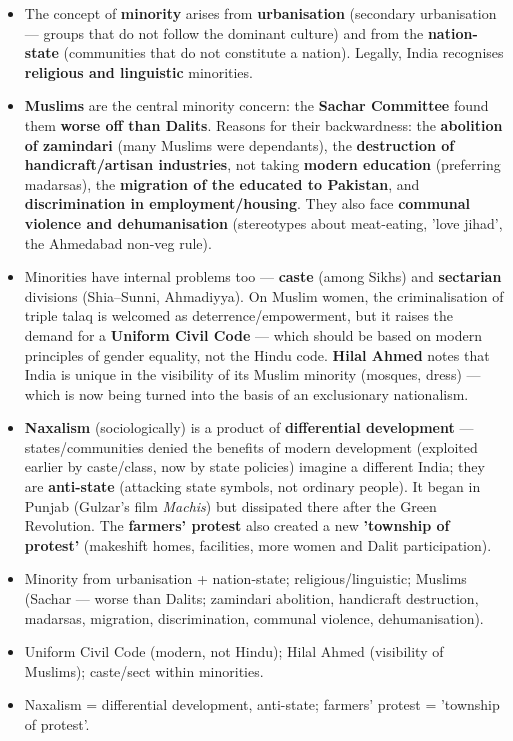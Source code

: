 \begin{KeyConcept}
\begin{itemize}
\item The concept of \textbf{minority} arises from \textbf{urbanisation} (secondary urbanisation --- groups that do not follow the dominant culture) and from the \textbf{nation-state} (communities that do not constitute a nation). Legally, India recognises \textbf{religious and linguistic} minorities.
\item \textbf{Muslims} are the central minority concern: the \textbf{Sachar Committee} found them \textbf{worse off than Dalits}. Reasons for their backwardness: the \textbf{abolition of zamindari} (many Muslims were dependants), the \textbf{destruction of handicraft/artisan industries}, not taking \textbf{modern education} (preferring madarsas), the \textbf{migration of the educated to Pakistan}, and \textbf{discrimination in employment/housing}. They also face \textbf{communal violence and dehumanisation} (stereotypes about meat-eating, 'love jihad', the Ahmedabad non-veg rule).
\item Minorities have internal problems too --- \textbf{caste} (among Sikhs) and \textbf{sectarian} divisions (Shia--Sunni, Ahmadiyya). On Muslim women, the criminalisation of triple talaq is welcomed as deterrence/empowerment, but it raises the demand for a \textbf{Uniform Civil Code} --- which should be based on modern principles of gender equality, not the Hindu code. \textbf{Hilal Ahmed} notes that India is unique in the visibility of its Muslim minority (mosques, dress) --- which is now being turned into the basis of an exclusionary nationalism.
\item \textbf{Naxalism} (sociologically) is a product of \textbf{differential development} --- states/communities denied the benefits of modern development (exploited earlier by caste/class, now by state policies) imagine a different India; they are \textbf{anti-state} (attacking state symbols, not ordinary people). It began in Punjab (Gulzar's film \emph{Machis}) but dissipated there after the Green Revolution. The \textbf{farmers' protest} also created a new \textbf{'township of protest'} (makeshift homes, facilities, more women and Dalit participation).
\end{itemize}
\end{KeyConcept}

\begin{QuickRevision}
\begin{itemize}
\item Minority from urbanisation + nation-state; religious/linguistic; Muslims (Sachar --- worse than Dalits; zamindari abolition, handicraft destruction, madarsas, migration, discrimination, communal violence, dehumanisation).
\item Uniform Civil Code (modern, not Hindu); Hilal Ahmed (visibility of Muslims); caste/sect within minorities.
\item Naxalism = differential development, anti-state; farmers' protest = 'township of protest'.
\end{itemize}
\end{QuickRevision}
